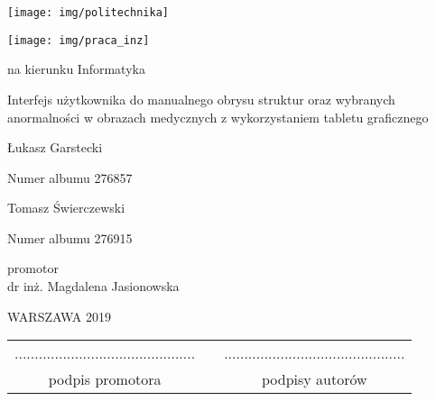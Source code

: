\documentclass[12pt,twoside,a4paper]{article}
\newcommand{\discipline}{Informatyka}
\renewcommand{\title}{Interfejs użytkownika do manualnego obrysu struktur oraz wybranych anormalności w obrazach medycznych z wykorzystaniem tabletu graficznego}
\newcommand{\supervisor}{dr inż. Magdalena Jasionowska}
\renewcommand{\year}{2019}
\newcommand{\authori}{Łukasz Garstecki}
\newcommand{\albumi}{276857}
\newcommand{\authorii}{Tomasz Świerczewski}
\newcommand{\albumii}{276915}
\begin{document}
\pagestyle{empty}

\begin{center}

\texttt{[image: img/politechnika]} 
\vspace{40pt}

\texttt{[image: img/praca\_inz]}  %

{ \arial na kierunku \discipline

\vspace{30pt}
{\arial \large \title}

\vspace{40pt}

{\arial \huge \authori }

\vspace{5pt}

Numer albumu \albumi

\vspace {20pt}
{\arial \huge \authorii}

\vspace{5pt}

Numer albumu \albumii

\vspace{40pt}

promotor \\
{\arial \supervisor}

\vspace{15pt}

 \vfill
WARSZAWA \year \\
}
\end{center}


\newpage
\null

\vfill

\begin{center}
\begin{tabular}[t]{ccc}
............................................. & \hspace*{100pt} & .............................................\\
podpis promotora & \hspace*{100pt} & podpisy autorów
\end{tabular}
\end{center}
\end{document}
